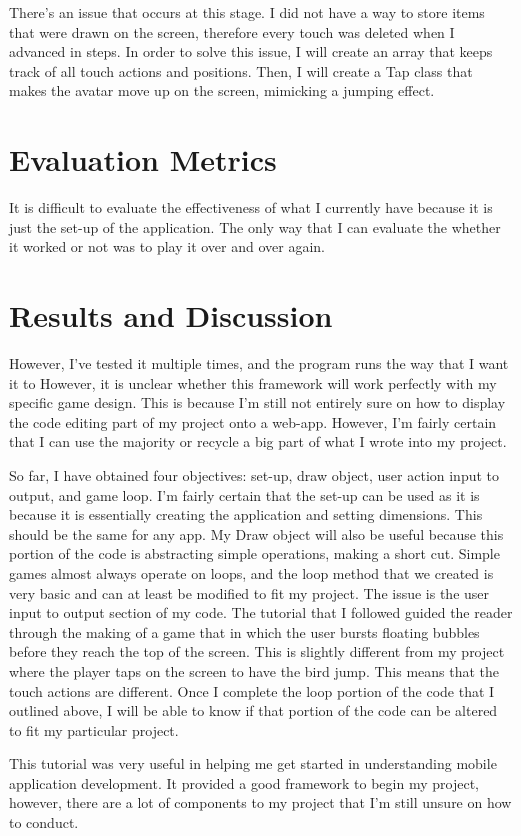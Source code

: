 \documentclass[10pt,twocolumn]{article}
\begin{document}
There’s an issue that occurs at this stage. I did not have a way to store items that were drawn on the screen, therefore every touch was deleted when I advanced in steps. In order to solve this issue, I will create an array that keeps track of all touch actions and positions. Then, I will create a Tap class that makes the avatar move up on the screen, mimicking a jumping effect.


\section{Evaluation Metrics}
It is difficult to evaluate the effectiveness of what I currently have because it is just the set-up of the application. The only way that I can evaluate the whether it worked or not was to play it over and over again.


\section{Results and Discussion}
However, I've tested it multiple times, and the program runs the way that I want it to However, it is unclear whether this framework will work perfectly with my specific game design. This is because I'm still not entirely sure on how to display the code editing part of my project onto a web-app. However, I'm fairly certain that I can use the majority or recycle a big part of what I wrote into my project. 

So far, I have obtained four objectives: set-up, draw object, user action input to output, and game loop. I'm fairly certain that the set-up can be used as it is because it is essentially creating the application and setting dimensions. This should be the same for any app. My Draw object will also be useful because this portion of the code is abstracting simple operations, making a short cut. Simple games almost always operate on loops, and the loop method that we created is very basic and can at least be modified to fit my project. The issue is the user input to output section of my code. The tutorial that I followed guided the reader through the making of a game that in which the user bursts floating bubbles before they reach the top of the screen. This is slightly different from my project where the player taps on the screen to have the bird jump. This means that the touch actions are different. Once I complete the loop portion of the code that I outlined above, I will be able to know if that portion of the code can be altered to fit my particular project. 

This tutorial was very useful in helping me get started in understanding mobile application development. It provided a good framework to begin my project, however, there are a lot of components to my project that I'm still unsure on how to conduct.
\end{document}

